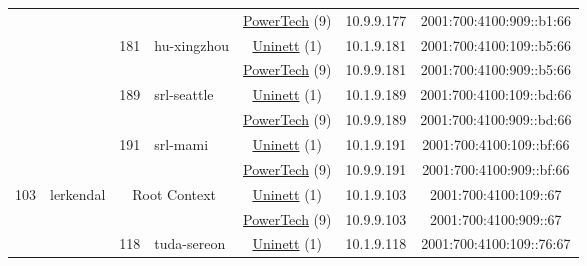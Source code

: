 \begin{small}
\begin{center}
\begin{longtable}{|c|c|c|c|c|c|c|c|}
  &  &  &  & \multicolumn{2}{|c|}{\tiny{\href{http://www.powertech.no}{PowerTech} (9)}} & \tiny{10.9.9.177} & \tiny{2001:700:4100:909::b1:66} \\* \cline{3-3}\cline{4-4}\cline{5-5}\cline{6-6}\cline{7-7}\cline{8-8}
  &  & \multirow{2}{*}{\tiny{181}} & \multicolumn{1}{|l|}{\multirow{2}{*}{\tiny{hu-xingzhou}}} & \multicolumn{2}{|c|}{\tiny{\href{https://www.uninett.no}{Uninett} (1)}} & \tiny{10.1.9.181} & \tiny{2001:700:4100:109::b5:66} \\* \cline{5-5}\cline{6-6}\cline{7-7}\cline{8-8}
  &  &  &  & \multicolumn{2}{|c|}{\tiny{\href{http://www.powertech.no}{PowerTech} (9)}} & \tiny{10.9.9.181} & \tiny{2001:700:4100:909::b5:66} \\* \cline{3-3}\cline{4-4}\cline{5-5}\cline{6-6}\cline{7-7}\cline{8-8}
  &  & \multirow{2}{*}{\tiny{189}} & \multicolumn{1}{|l|}{\multirow{2}{*}{\tiny{srl-seattle}}} & \multicolumn{2}{|c|}{\tiny{\href{https://www.uninett.no}{Uninett} (1)}} & \tiny{10.1.9.189} & \tiny{2001:700:4100:109::bd:66} \\* \cline{5-5}\cline{6-6}\cline{7-7}\cline{8-8}
  &  &  &  & \multicolumn{2}{|c|}{\tiny{\href{http://www.powertech.no}{PowerTech} (9)}} & \tiny{10.9.9.189} & \tiny{2001:700:4100:909::bd:66} \\* \cline{3-3}\cline{4-4}\cline{5-5}\cline{6-6}\cline{7-7}\cline{8-8}
  &  & \multirow{2}{*}{\tiny{191}} & \multicolumn{1}{|l|}{\multirow{2}{*}{\tiny{srl-mami}}} & \multicolumn{2}{|c|}{\tiny{\href{https://www.uninett.no}{Uninett} (1)}} & \tiny{10.1.9.191} & \tiny{2001:700:4100:109::bf:66} \\* \cline{5-5}\cline{6-6}\cline{7-7}\cline{8-8}
  &  &  &  & \multicolumn{2}{|c|}{\tiny{\href{http://www.powertech.no}{PowerTech} (9)}} & \tiny{10.9.9.191} & \tiny{2001:700:4100:909::bf:66} \\ \hline
 \multirow{26}{*}{\tiny{103}} & \multicolumn{1}{|l|}{\multirow{26}{*}{\tiny{lerkendal}}} & \multicolumn{2}{|c|}{\multirow{2}{*}{\tiny{Root Context}}} & \multicolumn{2}{|c|}{\tiny{\href{https://www.uninett.no}{Uninett} (1)}} & \tiny{10.1.9.103} & \tiny{2001:700:4100:109::67} \\* \cline{5-5}\cline{6-6}\cline{7-7}\cline{8-8}
  &  & \multicolumn{2}{|c|}{} & \multicolumn{2}{|c|}{\tiny{\href{http://www.powertech.no}{PowerTech} (9)}} & \tiny{10.9.9.103} & \tiny{2001:700:4100:909::67} \\* \cline{3-3}\cline{4-4}\cline{5-5}\cline{6-6}\cline{7-7}\cline{8-8}
  &  & \multirow{2}{*}{\tiny{118}} & \multicolumn{1}{|l|}{\multirow{2}{*}{\tiny{tuda-sereon}}} & \multicolumn{2}{|c|}{\tiny{\href{https://www.uninett.no}{Uninett} (1)}} & \tiny{10.1.9.118} & \tiny{2001:700:4100:109::76:67} \\* \cline{5-5}\cline{6-6}\cline{7-7}\cline{8-8}

\end{longtable}
\end{center}
\end{small}

